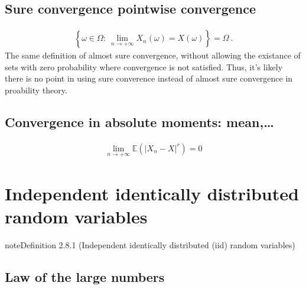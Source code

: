 \documentclass[letterpaper,10pt,english]{jupyterBook}
\begin{document}
\subsection{Sure convergence \sphinxhyphen{} pointwise convergence}
\label{\detokenize{ch/prob/convergence:sure-convergence-pointwise-convergence}}\label{\detokenize{ch/prob/convergence:prob-convergence-point}}\begin{equation*}
\begin{split}\left\{ \omega \in \Omega: \ \lim_{n \rightarrow + \infty} X_n(\omega) = X(\omega) \right\} = \Omega \ .\end{split}
\end{equation*}
\sphinxAtStartPar
The same definition of almost sure convergence, without allowing the existance of sets with zero probability where convergence is not satisfied. Thus, it’s likely there is no point in using sure converence instead of almost sure convergence in proability theory.


\subsection{Convergence in absolute moments: mean,…}
\label{\detokenize{ch/prob/convergence:convergence-in-absolute-moments-mean}}\label{\detokenize{ch/prob/convergence:prob-convergence-mean}}\begin{equation*}
\begin{split}\lim_{n \rightarrow +\infty} \mathbb{E}\left( \left| X_n - X \right|^r \right) = 0\end{split}
\end{equation*}
\sphinxstepscope


\section{Independent identically distributed random variables}
\label{\detokenize{ch/prob/iid:independent-identically-distributed-random-variables}}\label{\detokenize{ch/prob/iid:prob-iid}}\label{\detokenize{ch/prob/iid::doc}}\label{ch/prob/iid:definition-0}
\begin{sphinxadmonition}{note}{Definition 2.8.1 (Independent identically distributed (iid) random variables)}


\end{sphinxadmonition}


\subsection{Law of the large numbers}
\label{\detokenize{ch/prob/iid:law-of-the-large-numbers}}\label{\detokenize{ch/prob/iid:prob-iid-large-numbers}}
\end{document}
